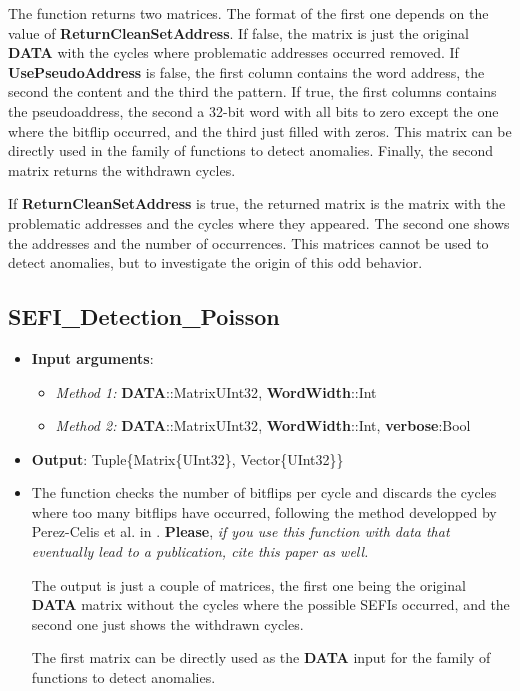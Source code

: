 \begin{itemize}
		The function returns two matrices. The format of the first one depends on the value of \textbf{ReturnCleanSetAddress}. If false, the matrix is just the original \textbf{DATA} with the cycles where problematic addresses occurred removed. If \textbf{UsePseudoAddress} is false, the first column contains the word address, the second the content and the third the pattern. If true, the first columns contains the pseudoaddress, the second a 32-bit word with all bits to zero except the one where the bitflip occurred, and the third just filled with zeros. This matrix can be directly used in the family of functions to detect anomalies. Finally, the second matrix returns the withdrawn cycles.
		
		If \textbf{ReturnCleanSetAddress} is true, the returned matrix is the matrix with the problematic addresses and the cycles where they appeared. The second one shows the addresses and the number of occurrences. This matrices cannot be used to detect anomalies, but to investigate the origin of this odd behavior.
		
	\end{itemize}
\subsection*{SEFI\_Detection\_Poisson}\label{Fun:SEFI_Detection_Poisson}

	\begin{itemize}
		\item \textbf{Input arguments}: 
		\begin{itemize}			
			\item \textit{Method 1:} \textbf{DATA}::Matrix{UInt32},
			\textbf{WordWidth}::Int
			\item \textit{Method 2:} \textbf{DATA}::Matrix{UInt32},
			\textbf{WordWidth}::Int,
			\textbf{verbose}:Bool
		\end{itemize}
		\item \textbf{Output}: Tuple\{Matrix\{UInt32\}, Vector\{UInt32\}\}
		
		\item The function checks the number of bitflips per cycle and discards the cycles where too many bitflips have occurred, following the method developped by Perez-Celis et al. in \cite{Perez-Celis2021}. \textbf{Please}, \textit{if you use this function with data that eventually lead to a publication, cite this paper as well.}
		
		The output is just a couple of matrices, the first one being the original \textbf{DATA} matrix without the cycles where the possible SEFIs occurred, and the second one just shows the withdrawn cycles.
		
		The first matrix can be directly used as the \textbf{DATA} input for the family of functions to detect anomalies.
	\end{itemize}

